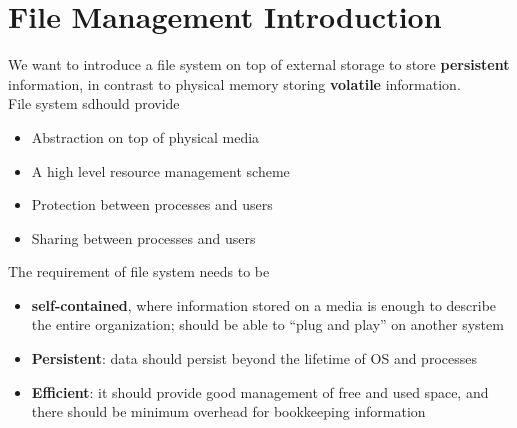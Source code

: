 \documentclass[12pt]{article}
\theoremstyle{definition}
\begin{document}
\section{File Management Introduction}
We want to introduce a file system on top of external storage to store \textbf{persistent} information, in contrast to physical memory storing \textbf{volatile} information.\\
File system sdhould provide
\begin{itemize}
  \item Abstraction on top of physical media
  \item A high level resource management scheme
  \item Protection between processes and users
  \item Sharing between processes and users
\end{itemize}
The requirement of file system needs to be
\begin{itemize}
  \item \textbf{self-contained}, where information stored on a media is enough to describe the entire organization; should be able to ``plug and play'' on another system
  \item \textbf{Persistent}: data should persist beyond the lifetime of OS and processes
  \item \textbf{Efficient}: it should provide good management of free and used space, and there should be minimum overhead for bookkeeping information
\end{itemize}
\end{document}
